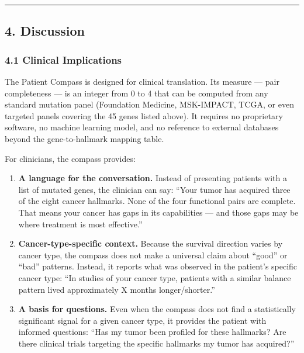 \documentclass[
  11pt,
]{article}
\begin{document}
\begin{center}\rule{0.5\linewidth}{0.5pt}\end{center}

\subsection{4. Discussion}\label{discussion}

\subsubsection{4.1 Clinical Implications}\label{clinical-implications}

The Patient Compass is designed for clinical translation. Its measure
--- pair completeness --- is an integer from 0 to 4 that can be computed
from any standard mutation panel (Foundation Medicine, MSK-IMPACT, TCGA,
or even targeted panels covering the 45 genes listed above). It requires
no proprietary software, no machine learning model, and no reference to
external databases beyond the gene-to-hallmark mapping table.

For clinicians, the compass provides:

\begin{enumerate}
\def\labelenumi{\arabic{enumi}.}
\item
  \textbf{A language for the conversation.} Instead of presenting
  patients with a list of mutated genes, the clinician can say: ``Your
  tumor has acquired three of the eight cancer hallmarks. None of the
  four functional pairs are complete. That means your cancer has gaps in
  its capabilities --- and those gaps may be where treatment is most
  effective.''
\item
  \textbf{Cancer-type-specific context.} Because the survival direction
  varies by cancer type, the compass does not make a universal claim
  about ``good'' or ``bad'' patterns. Instead, it reports what was
  observed in the patient's specific cancer type: ``In studies of your
  cancer type, patients with a similar balance pattern lived
  approximately X months longer/shorter.''
\item
  \textbf{A basis for questions.} Even when the compass does not find a
  statistically significant signal for a given cancer type, it provides
  the patient with informed questions: ``Has my tumor been profiled for
  these hallmarks? Are there clinical trials targeting the specific
  hallmarks my tumor has acquired?''
\end{enumerate}
\end{document}
